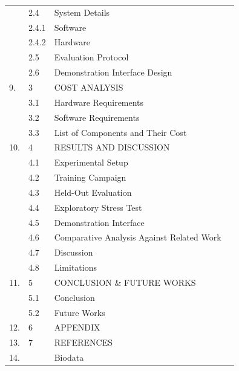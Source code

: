 \begin{center}
\begin{longtable}{p{1.1cm}p{1.5cm}p{9.2cm}p{2.1cm}}
 & 2.4 & System Details & \pageref{sec:system-details} \\
 & 2.4.1 & Software & \pageref{sec:software-stack} \\
 & 2.4.2 & Hardware & \pageref{sec:hardware} \\
 & 2.5 & Evaluation Protocol & \pageref{sec:eval-protocol} \\
 & 2.6 & Demonstration Interface Design & \pageref{sec:demo-ui-design} \\
9. & 3 & COST ANALYSIS & \pageref{ch:cost} \\
 & 3.1 & Hardware Requirements & \pageref{sec:cost-hardware} \\
 & 3.2 & Software Requirements & \pageref{sec:cost-software} \\
 & 3.3 & List of Components and Their Cost & \pageref{sec:cost-components} \\
10. & 4 & RESULTS AND DISCUSSION & \pageref{ch:results} \\
 & 4.1 & Experimental Setup & \pageref{sec:results-setup} \\
 & 4.2 & Training Campaign & \pageref{sec:training-campaign} \\
 & 4.3 & Held-Out Evaluation & \pageref{sec:held-out-evaluation} \\
 & 4.4 & Exploratory Stress Test & \pageref{sec:stress-test} \\
 & 4.5 & Demonstration Interface & \pageref{sec:demo-interface} \\
 & 4.6 & Comparative Analysis Against Related Work & \pageref{sec:comparative-analysis} \\
 & 4.7 & Discussion & \pageref{sec:discussion} \\
 & 4.8 & Limitations & \pageref{sec:limitations} \\
11. & 5 & CONCLUSION \& FUTURE WORKS & \pageref{ch:conclusion} \\
 & 5.1 & Conclusion & \pageref{sec:conclusion-body} \\
 & 5.2 & Future Works & \pageref{sec:future-works} \\
12. & 6 & APPENDIX & \pageref{ch:appendix} \\
13. & 7 & REFERENCES & \pageref{ch:references} \\
14. & & Biodata & \pageref{ch:biodata} \\
\bottomrule
\end{longtable}
\end{center}

